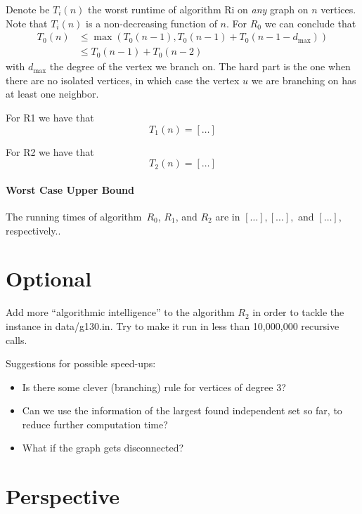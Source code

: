 \documentclass{tufte-handout}
\begin{document}
Denote be $T_i(n)$ the worst runtime of algorithm Ri on \emph{any} graph on $n$ vertices.
Note that $T_i(n)$ is a non-decreasing function of $n$.
For $R_0$ we can conclude that
\begin{align*}
T_0(n) &\leq\max(T_0(n-1), T_0(n-1)+T_0(n-1-d_{\mbox{max}})) \\ &\leq T_0(n-1)+T_0(n-2)
\end{align*}
with $d_{\mbox{max}}$ the degree of the vertex we branch on. The hard part is the one when there are no isolated vertices, in which case the vertex $u$ we are branching on has at least one neighbor. 

For R1 we have that
 \[
 T_1(n)=[\ldots]
 \]

For R2 we have that
 \[
 T_2(n)=[\ldots]
 \]
\paragraph{Worst Case Upper Bound}
The running times of algorithm~$R_0$, $R_1$, and $R_2$ are in
$[\ldots],[\ldots],$ and $[\ldots]$, respectively.. \newpage

\section{Optional}
Add more ``algorithmic intelligence'' to the algorithm $R_2$ in order to tackle the instance in data/g130.in.
Try to make it run in less than 10,000,000 recursive calls. 

Suggestions for possible speed-ups:
\begin{itemize}
\item Is there some clever (branching) rule for vertices of degree 3?
\item Can we use the information of the largest found independent set so far, to reduce further computation time?
\item What if the graph gets disconnected?
\end{itemize}

\newpage
\section{ Perspective}
\end{document}
